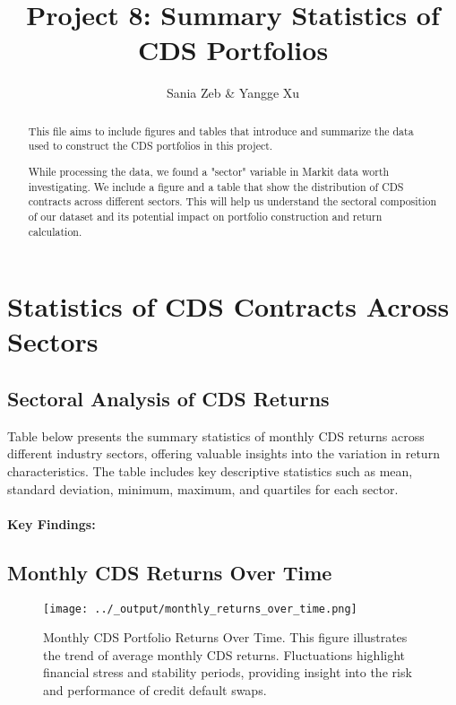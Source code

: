 \documentclass{article}
\title{Project 8: Summary Statistics of CDS Portfolios}
\author{Sania Zeb \& Yangge Xu}
\begin{document}
\maketitle

\begin{abstract}
This file aims to include figures and tables that introduce and summarize the 
data used to construct the CDS portfolios in this project.

While processing the data, we found a "sector" variable in Markit data worth investigating.
We include a figure and a table that show the distribution of CDS contracts across different sectors. 
This will help us understand the sectoral composition of our dataset and its potential impact on portfolio construction and return calculation.
\end{abstract}

\section{Statistics of CDS Contracts Across Sectors}

\subsection{Sectoral Analysis of CDS Returns}

Table below presents the summary statistics of monthly CDS returns across different industry sectors, offering valuable insights into the variation in return characteristics. The table includes key descriptive statistics such as mean, standard deviation, minimum, maximum, and quartiles for each sector.

\paragraph{Key Findings:}

\subsection{Monthly CDS Returns Over Time}
\begin{figure}[h]
    \centering
    \texttt{[image: ../\_output/monthly\_returns\_over\_time.png]}  %
    \caption{\label{fig:monthly_cds_returns} Monthly CDS Portfolio Returns Over Time. 
This figure illustrates the trend of average monthly CDS returns. 
Fluctuations highlight financial stress and stability periods, providing insight into the risk and performance of credit default swaps.}
\end{figure}
\end{document}
